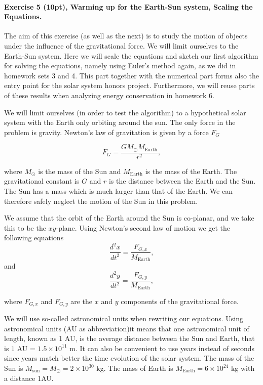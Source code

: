 \documentclass[%
oneside,                 %
final,                   %
10pt]{article}
\begin{document}
\paragraph{Exercise 5 (10pt), Warming up for the Earth-Sun system, Scaling the Equations.}
The aim of this exercise (as well as the next) is to study the motion
of objects under the influence of the gravitational force.  We will
limit ourselves to the Earth-Sun system. Here we will scale the
equations and sketch our first algorithm for solving the equations,
namely using Euler's method again, as we did in homework sets 3 and 4.  This part
together with the numerical part forms also the entry point for the
solar system honors project. Furthermore, we will reuse parts of these
results when analyzing energy conservation in homework 6.

We will limit ourselves (in order to test the algorithm) to a
hypothetical solar system with the Earth only orbiting around the sun.
The only force in the problem is gravity. Newton's law of gravitation
is given by a force $F_G$

\[
F_G=\frac{GM_{\odot}M_{\mathrm{Earth}}}{r^2},
\]

where $M_{\odot}$ is the mass of the Sun and $M_{\mathrm{Earth}}$ is
the mass of the Earth. The gravitational constant is $G$ and $r$ is
the distance between the Earth and the Sun.  The Sun
has a mass which is much larger than that of the Earth. We can
therefore safely neglect the motion of the Sun in this problem.

We assume that the orbit of the Earth around the Sun 
is co-planar, and we take this to be the $xy$-plane.
Using Newton's second law of motion we get the following equations
\[
\frac{d^2x}{dt^2}=\frac{F_{G,x}}{M_{\mathrm{Earth}}},
\]
and
\[
\frac{d^2y}{dt^2}=\frac{F_{G,y}}{M_{\mathrm{Earth}}},
\]

where $F_{G,x}$ and $F_{G,y}$ are the $x$ and $y$ components of the
gravitational force.

We will use so-called astronomical units when rewriting our equations.
Using astronomical units (AU as abbreviation)it means that one
astronomical unit of length, known as 1 AU, is the average distance
between the Sun and Earth, that is $1$ AU = $1.5\times 10^{11}$ m.  It
can also be convenient to use years instead of seconds since years
match better the time evolution of the solar system. The mass of the
Sun is $M_{\mathrm{sun}}=M_{\odot}=2\times 10^{30}$ kg. The mass of
Earth is $M_{\mathrm{Earth}}=6\times 10^{24}$ kg with a distance 1AU.
\end{document}
